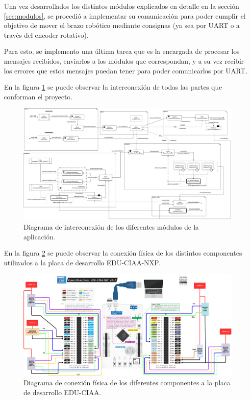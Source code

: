\documentclass{IEEEtran}
\begin{document}
Una vez desarrollados los distintos módulos explicados en detalle en la sección \ref{sec:modulos}, se procedió a implementar su comunicación para poder cumplir el objetivo de mover el brazo robótico mediante consignas (ya sea por UART o a través del encoder rotativo).

Para esto, se implemento una última tarea que es la encargada de procesar los mensajes recibidos, enviarlos a los módulos que correspondan, y a su vez recibir los errores que estos mensajes puedan tener para poder comunicarlos por UART.

En la figura \ref{fig:diagrama-app} se puede observar la interconexión de todas las partes que conforman el proyecto.

\begin{figure}
    \centering
    \includegraphics[scale=0.35]{../diagrama_app.png}
    \caption{Diagrama de interconexión de los diferentes módulos de la aplicación.}
    \label{fig:diagrama-app}
\end{figure}

En la figura \ref{fig:conexion-app} se puede observar la conexión física de los distintos componentes utilizados a la placa de desarrollo EDU-CIAA-NXP.

\begin{figure}
    \centering
    \includegraphics[scale=0.3]{../conexion_app.png}
    \caption{Diagrama de conexión física de los diferentes componentes a la placa de desarrollo EDU-CIAA.}
    \label{fig:conexion-app}
\end{figure}
\end{document}
